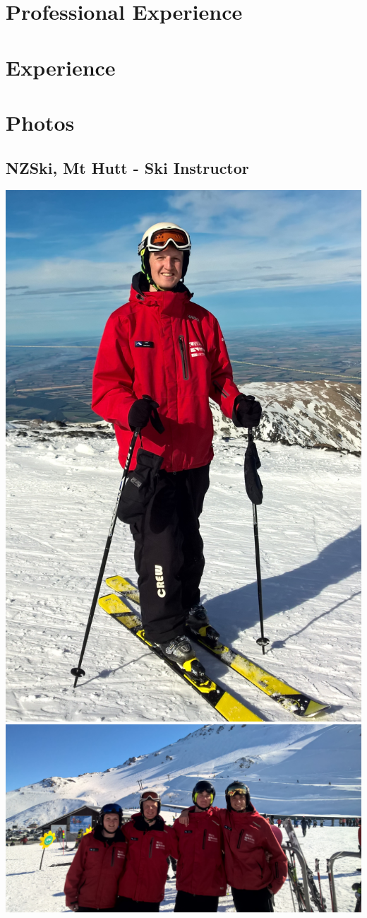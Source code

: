 \documentclass[letterpaper]{twentysecondcv} %
\begin{document}
\section{Professional Experience}

\begin{twenty} %
\end{twenty}

\section{Experience}

\begin{twenty} %
\end{twenty}

  \section{Photos}
  \subsection{NZSki, Mt Hutt - Ski Instructor}
      \includegraphics[height=0.4\textwidth]{skiInstructorPicture.jpg}
      \includegraphics[height=0.4\textwidth]{skiInstructorFriends.jpg}
\end{document}
